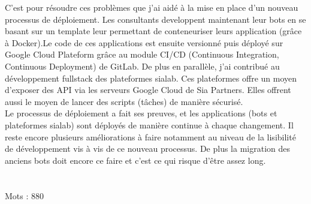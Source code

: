 \documentclass{article} %
\begin{document}
C'est pour résoudre ces problèmes que j'ai aidé à la mise en place d'un nouveau processus de déploiement. Les consultants developpent maintenant leur bots en se basant sur un template leur permettant de conteneuriser leurs application (grâce à Docker).Le code de ces applications est ensuite versionné puis déployé sur Google Cloud Plateform grâce au module CI/CD (Continuous Integration, Continuous Deployment) de GitLab. De plus en parallèle, j'ai contribué au développement fullstack des plateformes sialab. Ces plateformes offre un moyen d'exposer des API via les serveurs Google Cloud de Sia Partners. Elles offrent aussi le moyen de lancer des scripts (tâches) de manière sécurisé.\\

Le processus de déploiement a fait ses preuves, et les applications (bots et plateformes sialab) sont déployés de manière continue à chaque changement. Il reste encore plusieurs améliorations à faire notamment au niveau de la lisibilité de développement vis à vis de ce nouveau processus. De plus la migration des anciens bots doit encore ce faire et c'est ce qui risque d'être assez long.  \\ \\ \\

Mots : 880
\end{document}
